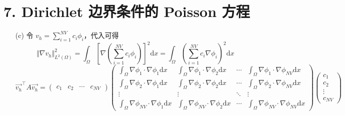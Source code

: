 \documentclass[a4paper]{article}
\begin{document}
\section*{7. Dirichlet 边界条件的 Poisson 方程}

\begin{enumerate}
    \item[(c)] 令 $v_h = \sum_{i=1}^{NV}c_i \phi_i$，代入可得
            \begin{equation}
                \Vert \nabla v_h \Vert^2_{L^2(\Omega)}
                = \int_{\Omega} 
                    \left[\nabla \left(\sum_{i=1}^{NV}c_i \phi_i\right)\right]^2 \text{d}x
                = \int_{\Omega} 
                    \left( \sum_{i=1}^{NV}c_i \nabla \phi_i \right)^2 \text{d}x
            \end{equation}
            \begin{equation}
                \vec{v_h}^\top A\vec{v_h}
                =
                \begin{pmatrix}
                    c_1 & c_2 & \cdots & c_{NV}
                \end{pmatrix}
                \begin{pmatrix}
                    \int_{\Omega} \nabla \phi_1 \cdot \nabla \phi_1 \text{d}x &
                    \int_{\Omega} \nabla \phi_1 \cdot \nabla \phi_2 \text{d}x &
                    \cdots &
                    \int_{\Omega} \nabla \phi_1 \cdot \nabla \phi_{NV} \text{d}x\\
                    \int_{\Omega} \nabla \phi_2 \cdot \nabla \phi_1 \text{d}x &
                    \int_{\Omega} \nabla \phi_2 \cdot \nabla \phi_2 \text{d}x &
                    \cdots &
                    \int_{\Omega} \nabla \phi_2 \cdot \nabla \phi_{NV} \text{d}x\\
                    \vdots & \vdots & \ddots & \vdots\\
                    \int_{\Omega} \nabla \phi_{NV} \cdot \nabla \phi_1 \text{d}x &
                    \int_{\Omega} \nabla \phi_{NV} \cdot \nabla \phi_2 \text{d}x &
                    \cdots &
                    \int_{\Omega} \nabla \phi_{NV} \cdot \nabla \phi_{NV} \text{d}x
                \end{pmatrix}
                \begin{pmatrix}
                    c_1\\ c_2\\ \vdots\\ c_{NV}
                \end{pmatrix}

\end{equation}
\end{enumerate}
\end{document}

